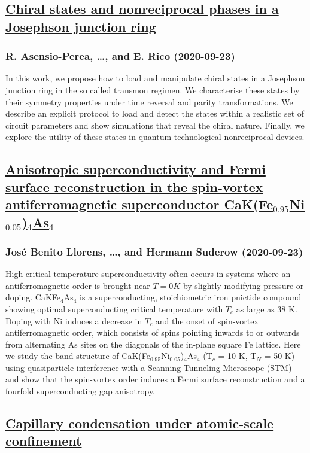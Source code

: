 \subsection*{\href{http://arxiv.org/abs/2009.11254v1}{Chiral states and nonreciprocal phases in a Josephson junction ring}}
\subsubsection*{R. Asensio-Perea, \dots, and E. Rico (2020-09-23)}
In this work, we propose how to load and manipulate chiral states in a
Josephson junction ring in the so called transmon regimen. We characterise
these states by their symmetry properties under time reversal and parity
transformations. We describe an explicit protocol to load and detect the states
within a realistic set of circuit parameters and show simulations that reveal
the chiral nature. Finally, we explore the utility of these states in quantum
technological nonreciprocal devices.

\subsection*{\href{http://arxiv.org/abs/2009.11246v1}{Anisotropic superconductivity and Fermi surface reconstruction in the  spin-vortex antiferromagnetic superconductor  CaK(Fe$_{0.95}$Ni$_{0.05}$)$_4$As$_4$}}
\subsubsection*{José Benito Llorens, \dots, and Hermann Suderow (2020-09-23)}
High critical temperature superconductivity often occurs in systems where an
antiferromagnetic order is brought near $T=0K$ by slightly modifying pressure
or doping. CaKFe$_4$As$_4$ is a superconducting, stoichiometric iron pnictide
compound showing optimal superconducting critical temperature with $T_c$ as
large as $38$ K. Doping with Ni induces a decrease in $T_c$ and the onset of
spin-vortex antiferromagnetic order, which consists of spins pointing inwards
to or outwards from alternating As sites on the diagonals of the in-plane
square Fe lattice. Here we study the band structure of
CaK(Fe$_{0.95}$Ni$_{0.05}$)$_4$As$_4$ (T$_c$ = 10 K, T$_N$ = 50 K) using
quasiparticle interference with a Scanning Tunneling Microscope (STM) and show
that the spin-vortex order induces a Fermi surface reconstruction and a
fourfold superconducting gap anisotropy.

\subsection*{\href{http://arxiv.org/abs/2009.11238v1}{Capillary condensation under atomic-scale confinement}}
